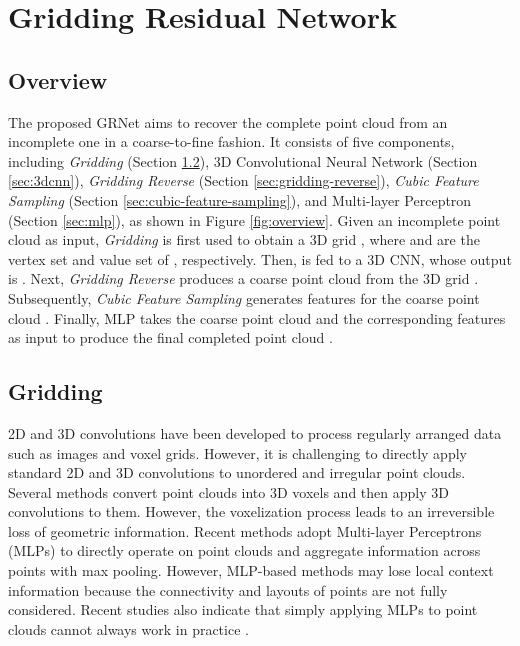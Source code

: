 \documentclass[runningheads]{llncs}
\begin{document}
\section{Gridding Residual Network}

\subsection{Overview}

The proposed GRNet aims to recover the complete point cloud from an incomplete one in a coarse-to-fine fashion. 
It consists of five components, including {\it Gridding} (Section \ref{sec:gridding}), 3D Convolutional Neural Network  (Section \ref{sec:3dcnn}), {\it Gridding Reverse} (Section \ref{sec:gridding-reverse}), {\it Cubic Feature Sampling} (Section \ref{sec:cubic-feature-sampling}), and Multi-layer Perceptron (Section \ref{sec:mlp}), as shown in Figure \ref{fig:overview}.
Given an incomplete point cloud  as input, {\it Gridding} is first used to obtain a 3D grid , where  and  are the vertex set and value set of , respectively.
Then,  is fed to a 3D CNN, whose output is . 
Next, {\it Gridding Reverse} produces a coarse point cloud  from the 3D grid .
Subsequently, {\it Cubic Feature Sampling} generates features  for the coarse point cloud .
Finally, MLP takes the coarse point cloud  and the corresponding features  as input to produce the final completed point cloud .

\subsection{Gridding}
\label{sec:gridding}

2D and 3D convolutions have been developed to process regularly arranged data such as images and voxel grids.
However, it is challenging to directly apply standard 2D and 3D convolutions to unordered and irregular point clouds.
Several methods \cite{DBLP:conf/cvpr/DaiQN17,DBLP:conf/iccv/HanLHKY17,DBLP:conf/nips/LiuTLH19,DBLP:journals/tvcg/LiSWZ17} convert point clouds into 3D voxels and then apply 3D convolutions to them.
However, the voxelization process leads to an irreversible loss of geometric information.
Recent methods \cite{DBLP:conf/ThreeDim/YuanKHMH18,DBLP:conf/cvpr/TchapmiKR0S19} adopt Multi-layer Perceptrons (MLPs) to directly operate on point clouds and aggregate information across points with max pooling.
However, MLP-based methods may lose local context information because the connectivity and layouts of points are not fully considered.
Recent studies also indicate that simply applying MLPs to point clouds cannot always work in practice \cite{DBLP:conf/iccv/MaoWL19,DBLP:conf/eccv/XuFXZQ18}.
\end{document}
